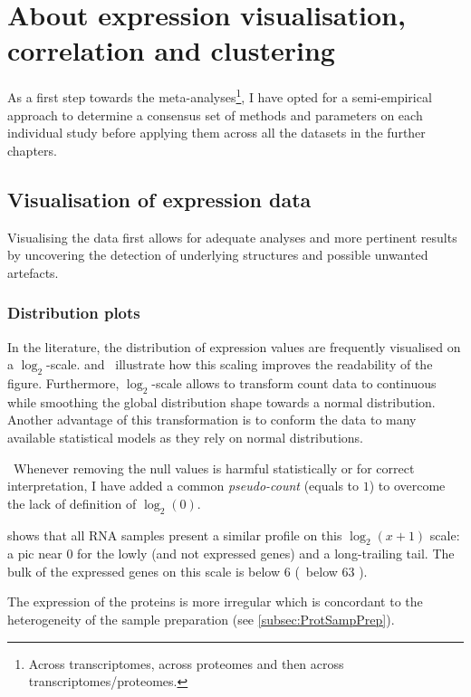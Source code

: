 \chapter{About expression visualisation, correlation and clustering}
\label{ch:expression}

As a first step towards the meta-analyses\footnote{Across transcriptomes, across
proteomes and then across transcriptomes/proteomes.},
I have opted for a semi-empirical approach to determine
a consensus set of methods and parameters on each individual study
before applying them across all the datasets in the further chapters.


\section{Visualisation of expression data}

Visualising the data first allows for adequate analyses
and more pertinent results by uncovering
the detection of underlying structures and possible unwanted artefacts.

\subsection{Distribution plots}

In the literature, the distribution of expression values are frequently
visualised on a $\log_{2}$-scale.
 and~ illustrate how
this scaling improves the readability of the figure.
Furthermore, $\log_{2}$-scale allows to transform count data to continuous
while smoothing the global distribution shape towards a normal distribution.
Another advantage of this transformation is to conform the data to many available
statistical models as they rely on normal distributions.

\NB\ Whenever removing the null values is harmful statistically
or for correct interpretation,
I have added a common \emph{pseudo-count} (equals to $1$)
to overcome the lack of definition of $\log_{2}(0)$.

 shows that all \gls{RNA} samples present a similar
profile on this $\log_{2}(x+1)$ scale:
a pic near $0$ for the lowly (and not expressed genes) and a long-trailing tail.
The bulk of the expressed genes on this scale is below $6$ (\ie\ below 63 \FPKM).

The expression of the proteins is more irregular which is concordant to the
heterogeneity of the sample preparation (see \cref{subsec:ProtSampPrep}).


